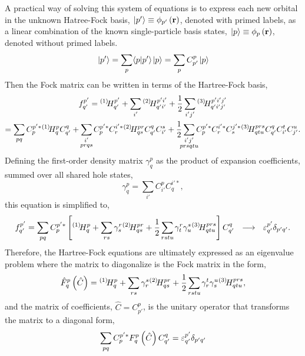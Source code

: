 \documentclass[thesis.tex]{subfiles}
\begin{document}
A practical way of solving this system of equations is to express each new orbital in the unknown Hatree-Fock basis, $\hspace{1pt}\lvert p' \rangle \equiv \phi_{p'}\left(\mathbf{r}\right)$, denoted with primed labels, as a linear combination of the known single-particle basis states, $\hspace{1pt}\lvert p \rangle \equiv \phi_{p}\left(\mathbf{r}\right)$, denoted without primed labels.
\begin{equation}
  \hspace{1pt}\lvert p' \rangle = \sum_{p}\langle p | p'\rangle\hspace{1pt}\lvert p \rangle = \sum_{p}C^{p}_{p'}\hspace{1pt}\lvert p \rangle
\end{equation}
Then the Fock matrix can be written in terms of the Hartree-Fock basis,
\begin{gather}
  \fint{p'}{q'} = \Hint{1}{p'}{q'} + \sum_{\mathclap{i'}}\Hint{2}{p'i'}{q'i'} + \frac{1}{2}\sum_{\mathclap{i'j'}}\Hint{3}{p'i'j'}{q'i'j'} \notag \\
  = \sum_{\mathclap{pq}}C^{p'*}_{p}\Hint{1}{p}{q}C^{q}_{q'} + \sum_{\mathclap{\substack{i' \\ prqs}}}C^{p'*}_{p}C^{i'*}_{r}\Hint{2}{pr}{qs}C^{q}_{q'}C^{s}_{i'} + \frac{1}{2}\sum_{\mathclap{\substack{i'j' \\ prsqtu}}}C^{p'*}_{p}C^{i'*}_{r}C^{j'*}_{s}\Hint{3}{prs}{qtu}C^{q}_{q'}C^{t}_{i'}C^{u}_{j'}.
\end{gather}
Defining the first-order density matrix $\gamma^{p}_{q}$ as the product of expansion coefficients, summed over all shared hole states,
\begin{equation}
  \gamma^{p}_{q} = \sum_{i'}C^{p}_{i'}C^{i'*}_{q},
\end{equation}
this equation is simplified to,
\begin{equation}
  \fint{p'}{q'} = \sum_{\mathclap{pq}}C^{p'*}_{p}\left[ \Hint{1}{p}{q} + \sum_{\mathclap{rs}}\gamma^{r}_{s}\Hint{2}{pr}{qs} + \frac{1}{2}\sum_{\mathclap{rstu}}\gamma^{r}_{t}\gamma^{s}_{u}\Hint{3}{prs}{qtu} \right]C^{q}_{q'}\ \ \longrightarrow\ \ \varepsilon^{p'}_{q'}\delta_{p'q'}.
\end{equation}
Therefore, the Hartree-Fock equations are ultimately expressed as an eigenvalue problem where the matrix to diagonalize is the Fock matrix in the form,
\begin{equation}
  \hat{F}^{p}_{q}\left(\hat{C}\right) = \Hint{1}{p}{q} + \sum_{\mathclap{rs}}\gamma^{s}_{r}\Hint{2}{pr}{qs} + \frac{1}{2}\sum_{\mathclap{rstu}}\gamma^{t}_{r}\gamma^{u}_{s}\Hint{3}{prs}{qtu},
\end{equation}
and the matrix of coefficients, $\hat{C} = C^{p}_{p'}$, is the unitary operator that transforms the matrix to a diagonal form,
\begin{equation}
  \sum_{\mathclap{pq}}C^{p'*}_{p}F^{p}_{q}\left(\hat{C}\right)C^{q}_{q'} = \varepsilon^{p'}_{q'}\delta_{p'q'}
\end{equation}
\end{document}
